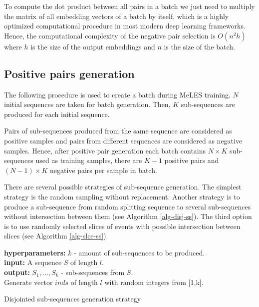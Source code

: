 \documentclass[sigconf, anonymous]{acmart}
\begin{document}
To compute the dot product between all pairs in a batch we just need to multiply the matrix of all embedding vectors of a batch by itself, which is a highly optimized computational procedure in most modern deep learning frameworks. Hence, the computational complexity of the negative pair selection is $O(n^2h)$ where $h$ is the size of the output embeddings and $n$ is the size of the batch.

\subsection{Positive pairs generation} \label{sec-pos-pairs}

The following procedure is used to create a batch during MeLES training. $N$ initial sequences are taken for batch generation. Then, $K$ sub-sequences are produced for each initial sequence.

Pairs of sub-sequences produced from the same sequence are considered as positive samples and pairs from different sequences are considered as negative samples. Hence, after positive pair generation each batch contains $N \times K$ sub-sequences used as training samples, there are $K-1$ positive pairs and $(N - 1) \times K$ negative pairs per sample in batch.

There are several possible strategies of sub-sequence generation. The simplest strategy is the random sampling without replacement. Another strategy is to produce a sub-sequence from random splitting sequence to several sub-sequences without intersection between them (see Algorithm \ref{alg-disj-ss}). The third option is to use randomly selected slices of events with possible intersection between slices (see Algorithm \ref{alg-slce-ss}).

\begin{algorithm}
\SetAlgoLined
\textbf{hyperparameters:} $k$ - amount of sub-sequences to be produced. \\
\textbf{input:} A sequence $S$ of length $l$. \\
\textbf{output:} $S_1,...,S_k$ - sub-sequences from $S$. \\

\BlankLine
Generate vector $inds$ of length $l$ with random integers from [1,k].\\
 \caption{Disjointed sub-sequences generation strategy}
\label{alg-disj-ss}

\end{algorithm}
\end{document}

